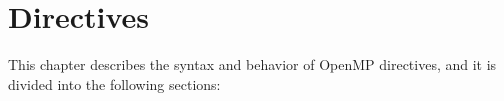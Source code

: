 %
%
%
%
%
%
%
%
%
%
%
%
%
\chapter{Directives}
\label{chap:Directives}
This chapter describes the syntax and behavior of OpenMP directives, and it is divided
into the following sections:

